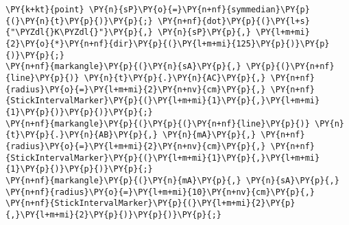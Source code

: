 \begin{Verbatim}[commandchars=\\\{\}]
\PY{k+kt}{point} \PY{n}{sP}\PY{o}{=}\PY{n+nf}{symmedian}\PY{p}{(}\PY{n}{t}\PY{p}{)}\PY{p}{;} \PY{n+nf}{dot}\PY{p}{(}\PY{l+s}{"\PYZdl{}K\PYZdl{}"}\PY{p}{,} \PY{n}{sP}\PY{p}{,} \PY{l+m+mi}{2}\PY{o}{*}\PY{n+nf}{dir}\PY{p}{(}\PY{l+m+mi}{125}\PY{p}{)}\PY{p}{)}\PY{p}{;}
\PY{n+nf}{markangle}\PY{p}{(}\PY{n}{sA}\PY{p}{,} \PY{p}{(}\PY{n+nf}{line}\PY{p}{)} \PY{n}{t}\PY{p}{.}\PY{n}{AC}\PY{p}{,} \PY{n+nf}{radius}\PY{o}{=}\PY{l+m+mi}{2}\PY{n+nv}{cm}\PY{p}{,} \PY{n+nf}{StickIntervalMarker}\PY{p}{(}\PY{l+m+mi}{1}\PY{p}{,}\PY{l+m+mi}{1}\PY{p}{)}\PY{p}{)}\PY{p}{;}
\PY{n+nf}{markangle}\PY{p}{(}\PY{p}{(}\PY{n+nf}{line}\PY{p}{)} \PY{n}{t}\PY{p}{.}\PY{n}{AB}\PY{p}{,} \PY{n}{mA}\PY{p}{,} \PY{n+nf}{radius}\PY{o}{=}\PY{l+m+mi}{2}\PY{n+nv}{cm}\PY{p}{,} \PY{n+nf}{StickIntervalMarker}\PY{p}{(}\PY{l+m+mi}{1}\PY{p}{,}\PY{l+m+mi}{1}\PY{p}{)}\PY{p}{)}\PY{p}{;}
\PY{n+nf}{markangle}\PY{p}{(}\PY{n}{mA}\PY{p}{,} \PY{n}{sA}\PY{p}{,} \PY{n+nf}{radius}\PY{o}{=}\PY{l+m+mi}{10}\PY{n+nv}{cm}\PY{p}{,} \PY{n+nf}{StickIntervalMarker}\PY{p}{(}\PY{l+m+mi}{2}\PY{p}{,}\PY{l+m+mi}{2}\PY{p}{)}\PY{p}{)}\PY{p}{;}
\end{Verbatim}
